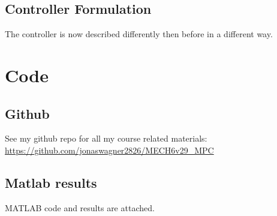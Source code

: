 \documentclass[]{article}
\begin{document}
\subsection{Controller Formulation}
The controller is now described differently then before in a different way.






\newpage
\appendix
\section{Code}
\subsection{Github}
See my github repo for all my course related materials: 
\url{https://github.com/jonaswagner2826/MECH6v29_MPC}

\subsection{Matlab results}
MATLAB code and results are attached.
% 
% 
% 
\end{document}
